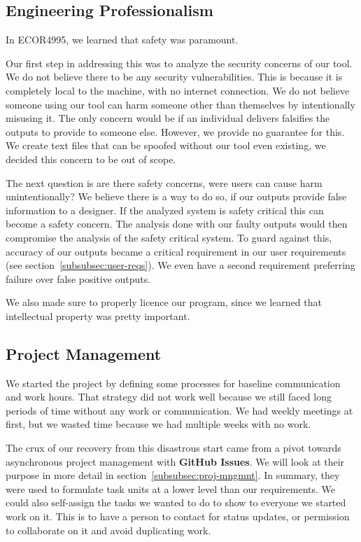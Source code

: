 
\subsection{Engineering Professionalism}\label{subsec:engineering-professionalism}
In ECOR4995, we learned that safety was paramount.

Our first step in addressing this was to analyze the security concerns of our tool.
We do not believe there to be any security vulnerabilities.
This is because it is completely local to the machine, with no internet connection.
We do not believe someone using our tool can harm someone other than themselves by intentionally misusing it.
The only concern would be if an individual delivers falsifies the outputs to provide to someone else.
However, we provide no guarantee for this.
We create text files that can be spoofed without our tool even existing, we decided this concern to be out of scope.

The next question is are there safety concerns, were users can cause harm unintentionally?
We believe there is a way to do so, if our outputs provide false information to a designer.
If the analyzed system is safety critical this can become a safety concern.
The analysis done with our faulty outputs would then compromise the analysis of the safety critical system.
To guard against this, accuracy of our outputs became a critical requirement in our user requirements (see section~\ref{subsubsec:user-reqs}).
We even have a second requirement preferring failure over false positive outputs.

We also made sure to properly licence our program, since we learned that intellectual property was pretty important.

\subsection{Project Management}\label{subsec:project-management}
We started the project by defining some processes for baseline communication and work hours.
That strategy did not work well because we still faced long periods of time without any work or communication.
We had weekly meetings at first, but we wasted time because we had multiple weeks with no work.

The crux of our recovery from this disastrous start came from a pivot towards asynchronous project management with \textbf{GitHub Issues}.
We will look at their purpose in more detail in section~\ref{subsubsec:proj-mngmnt}.
In summary, they were used to formulate task units at a lower level than our requirements.
We could also self-assign the tasks we wanted to do to show to everyone we started work on it.
This is to have a person to contact for status updates, or permission to collaborate on it and avoid duplicating work.

